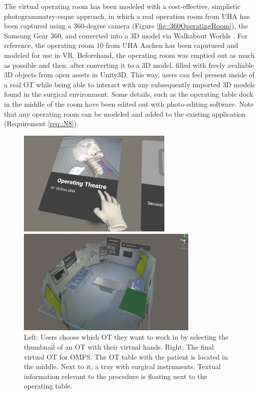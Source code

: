 The virtual operating room has been modeled with a cost-effective, simplistic
\\photogrammatry-esque approach, in which a real operation room from UHA has been captured using a 
360-degree camera (Figure \ref{fig::360OperatingRoom}), the Samsung Gear 360, and converted into a 3D model via Walkabout Worlds \cite{WalkaboutWorlds}.
For reference, the operating room 10 from UHA Aachen has been caputured and modeled for use in VR.
Beforehand, the operating room was emptied out as much as possible and then, after converting it to a 3D model, filled with freely avaliable 3D objects from open assets in Unity3D.
This way, users can feel present inside of a real OT while being able to interact with any subsequently imported 3D models found in the surgical environment.
Some details, such as the operating table dock in the middle of the room have been edited out with photo-editing software.
Note that any operating room can be modeled and added to the existing application (Requirement \ref{req::N8}).


\begin{figure}[ht]
  \centering
  \begin{minipage}{.5\textwidth}
    \centering
    \includegraphics[width=0.99\linewidth, height=5.1cm]{images/implementation/vot/select_op.png}
  \end{minipage}%
  \begin{minipage}{.5\textwidth}
    \centering
    \includegraphics[width=0.99\linewidth, height=5.1cm]{images/implementation/vot/overview.png}
  \end{minipage}
  \caption{\label{fig::SceneSelect} Left: Users choose which OT they want to work in by selecting the thumbnail of an OT with their virtual hands. Right: The final virtual OT for OMFS. 
  The OT table with the patient is located in the middle. Next to it, a tray with surgical instruments.
  Textual information relevant to the procedure is floating next to the operating table.}
\end{figure}

